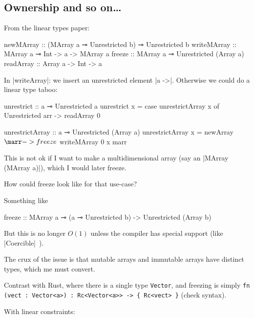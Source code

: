 \subsection{Ownership and so on…}

From the linear types paper:

\begin{spec}
  newMArray    :: (MArray a ⊸ Unrestricted b) ⊸ Unrestricted b
  writeMArray  :: MArray a ⊸ Int -> a -> MArray a
  freeze       :: MArray a ⊸ Unrestricted (Array a)
  readArray    :: Array a -> Int -> a
\end{spec}

In |writeArray|: we insert an unrestricted element |a ->|. Otherwise
we could do a linear type taboo:

\begin{spec}
unrestrict :: a ⊸ Unrestricted a
unrestrict x = case unrestrictArray x of
  Unrestricted arr -> readArray 0

unrestrictArray :: a ⊸ Unrestricted (Array a)
unrestrictArray x = newArray $ \marr ->
  freeze $
  writeMArray 0 x marr
\end{spec} %

This is not ok if I want to make a multidimensional array (say an
|MArray (MArray a)|), which I would later freeze.

How could freeze look like for that use-case?

Something like

\begin{spec}
  freeze :: MArray a ⊸ (a ⊸ Unrestricted b) -> Unrestricted (Array b)
\end{spec}

But this is no longer $O(1)$ unless the compiler has special support
(like |Coercible|~\cite{safe-coercions}).

The crux of the issue is that mutable arrays and immutable arrays have
distinct types, which me must convert.

Contrast with Rust, where there is a single type \verb+Vector+, and
freezing is simply
\verb+fn (vect : Vector<a>) : Rc<Vector<a>> -> { Rc<vect> }+ (check
syntax).

With linear constraints:

